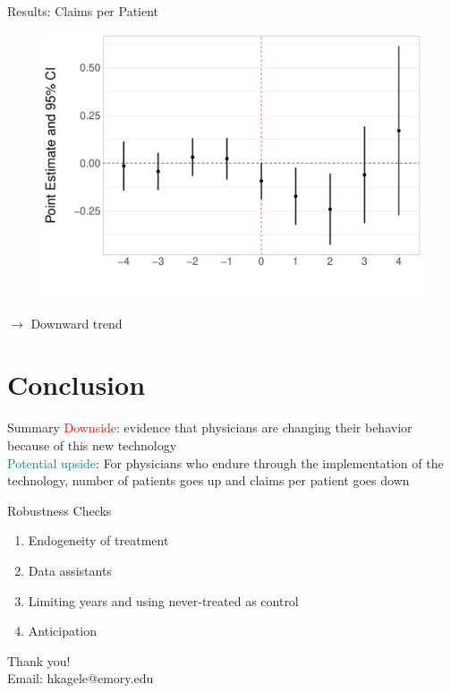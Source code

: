 \documentclass[10pt]{beamer}
\begin{document}
\begin{frame}{Results: Claims per Patient}
\begin{figure}[ht]
\centering
\includegraphics[scale=.35]{Objects/Presentation_claimperpatient_all.pdf}
\end{figure}
$\rightarrow$ Downward trend
\end{frame}



\section{Conclusion}


\begin{frame}{Summary}
\textcolor{red}{Downside}: evidence that physicians are changing their behavior because of this new technology\\
                \vspace{6mm}
\textcolor{teal}{Potential upside}: For physicians who endure through the implementation of the technology, number of patients goes up and claims per patient goes down

\end{frame}

\begin{frame}{Robustness Checks}
\begin{enumerate}
    \item Endogeneity of treatment
            \vspace{3mm}
    \item Data assistants
            \vspace{3mm}
    \item Limiting years and using never-treated as control
            \vspace{3mm}
    \item Anticipation
\end{enumerate}
\end{frame}


\begin{frame}[plain]{}
\centering
    Thank you! \\
    \vspace{5mm}
    Email: hkagele@emory.edu
\end{frame}
\end{document}

